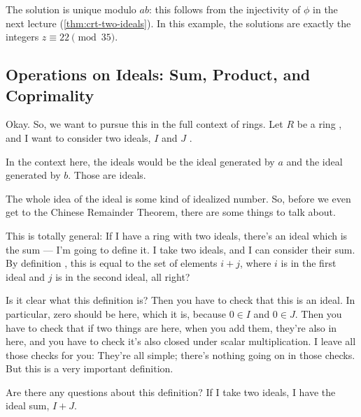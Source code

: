\begin{aiNote}
The solution is unique modulo $ab$: this follows from the injectivity of $\phi$ in the next lecture (\cref{thm:crt-two-ideals}). In this example, the solutions are exactly the integers $z \equiv 22 \pmod{35}$.
\end{aiNote}

\subsection{Operations on Ideals: Sum, Product, and Coprimality}

\begin{speech}[01:10:32 - 01:12:09]
Okay. So, we want to pursue this in the full context of rings. Let $R$ be a ring , and I want to consider two ideals, $I$ and $J$ .

In the context here, the ideals would be the ideal generated by $a$ and the ideal generated by $b$. Those are ideals.

The whole idea of the ideal is some kind of idealized number. So, before we even get to the Chinese Remainder Theorem, there are some things to talk about.

This is totally general: If I have a ring with two ideals, there's an ideal which is the sum --- I'm going to define it. I take two ideals, and I can consider their sum. By definition , this is equal to the set of elements $i + j$, where $i$ is in the first ideal and $j$ is in the second ideal, all right?

Is it clear what this definition is? Then you have to check that this is an ideal. In particular, zero should be here, which it is, because $0 \in I$ and $0 \in J$. Then you have to check that if two things are here, when you add them, they're also in here, and you have to check it's also closed under scalar multiplication. I leave all those checks for you: They're all simple; there's nothing going on in those checks. But this is a very important definition.

Are there any questions about this definition? If I take two ideals, I have the ideal sum, $I + J$.
\end{speech}

